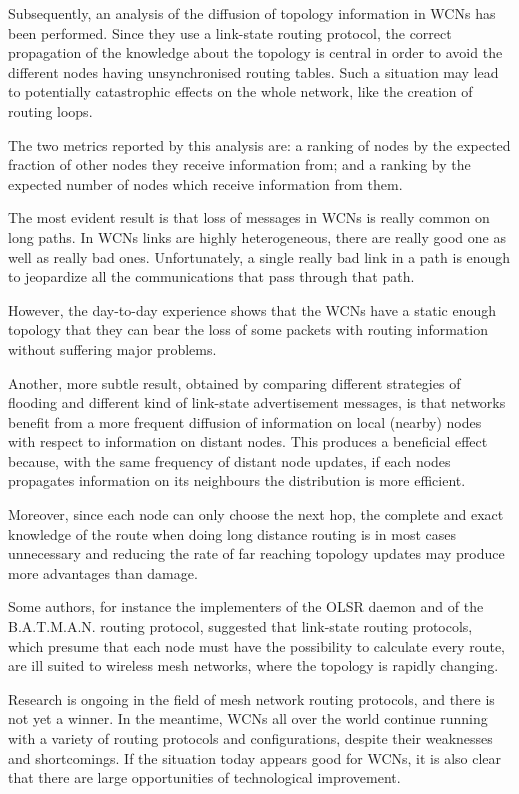 \documentclass[a4paper,11pt,twoside,openright]{memoir}
\begin{document}
Subsequently, an analysis of the diffusion of topology information in WCNs
has been performed. Since they use a link-state routing protocol, the correct
propagation of the knowledge about the topology is central in order to avoid
the different nodes having unsynchronised routing tables. Such a situation
may lead to potentially catastrophic effects on the whole network, like the
creation of routing loops.

The two metrics reported by this analysis are: a ranking of nodes by the expected
fraction of other nodes they receive information from; and a ranking by the
expected number of nodes which receive information from them.

The most evident result is that loss
of messages in WCNs is really common on long paths. In WCNs links are highly
heterogeneous, there are really good one as well as really bad ones.
Unfortunately, a single really bad link in a path is enough to jeopardize
all the communications that pass through that path.

However, the day-to-day experience shows that the WCNs have a static enough
topology that they can bear the loss of some packets with routing information
without suffering major problems.

Another, more subtle result, obtained by comparing different strategies of
flooding and different kind of link-state advertisement messages, is that
networks benefit from a more frequent diffusion of information on local (nearby)
nodes with respect to information on distant nodes. This produces a beneficial
effect because, with the same frequency of distant node updates, if each nodes
propagates information on its neighbours the distribution is more efficient.

Moreover, since each node can only choose the next hop, the complete and exact
knowledge of the route when doing long distance routing is in most cases
unnecessary and reducing the rate of far reaching topology updates may produce
more advantages than damage.

Some authors, for instance the implementers of the OLSR daemon and of the
B.A.T.M.A.N. routing protocol, suggested that link-state routing protocols,
which presume that each node must have the possibility to calculate every
route, are ill suited to wireless mesh networks, where the topology
is rapidly changing.

Research is ongoing in the field of mesh network routing protocols, and there
is not yet a winner. In the meantime, WCNs all over the world continue
running with a variety of routing protocols and configurations, despite their
weaknesses and shortcomings.
If the situation today appears good for WCNs, it is also clear that there are
large opportunities of technological improvement.
\end{document}
